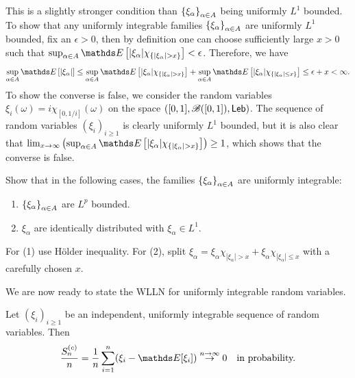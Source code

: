 \begin{unexaminable}
\begin{remark}
This is a slightly stronger condition than $\left\{ \xi_\alpha \right \}_{\alpha \in A}$ being uniformly $L^1$ bounded. To show that any uniformly integrable families $\left\{ \xi_\alpha \right \}_{\alpha \in A}$ are uniformly $L^1$ bounded, fix an $\epsilon > 0$, then by definition one can choose sufficiently large $x > 0$ such that $\sup_{\alpha \in A} \E\sqbracket{|\xi_\alpha| \chi_{\set{|\xi_\alpha| > x}}} < \epsilon$. Therefore, we have 
\begin{equation*}
\sup_{\alpha \in A} \E\sqbracket{\abs{\xi_\alpha}} \leq \sup_{\alpha \in A} \E\sqbracket{|\xi_\alpha| \chi_{\set{|\xi_\alpha| > x}}} + \sup_{\alpha \in A} \E\sqbracket{|\xi_\alpha| \chi_{\set{|\xi_\alpha| \leq x}}} \leq \epsilon + x < \infty.
\end{equation*}
To show the converse is false, we consider the random variables $\xi_i(\omega) = i \chi_{[0,1/i]}(\omega)$ on the space $([0,1], \mathcal{B}([0,1]), \mathsf{Leb})$. The sequence of random variables $(\xi_i)_{i\geq 1}$ is clearly uniformly $L^1$ bounded, but it is also clear that $\lim_{x \to \infty} \bracket{\sup_{\alpha \in A} \E\sqbracket{|\xi_\alpha| \chi_{\set{|\xi_\alpha| > x}}}} \geq 1$, which shows that the converse is false.
\end{remark}

\begin{exercise}
Show that in the following cases, the families $\left\{ \xi_\alpha \right \}_{\alpha \in A}$ are uniformly integrable:
\begin{enumerate}
\item $\left\{ \xi_{\alpha} \right \}_{\alpha \in A}$ are $L^p$ bounded.
\item $\xi_{\alpha}$ are identically distributed with $\xi_\alpha \in L^1$.
\end{enumerate}
\end{exercise}

\begin{hint}
For (1) use H\"{o}lder inequality. For (2), split $\xi_\alpha = \xi_\alpha \chi_{|\xi_\alpha|>x} + \xi_\alpha \chi_{|\xi_\alpha|\leq x}$ with a carefully chosen $x$.
\end{hint}

We are now ready to state the WLLN for uniformly integrable random variables.
\begin{theorem} Let $(\xi_i)_{i\geq 1}$ be an independent, uniformly integrable sequence of random variables. Then 
\begin{equation*}
\frac{S_n^{(c)}}{n} = \frac{1}{n} \sum_{i=1}^n (\xi_i - \E[\xi_i]) \overset{n\to\infty}\to 0 \quad \text{in probability.}
\end{equation*}
\end{theorem}


\end{unexaminable}

